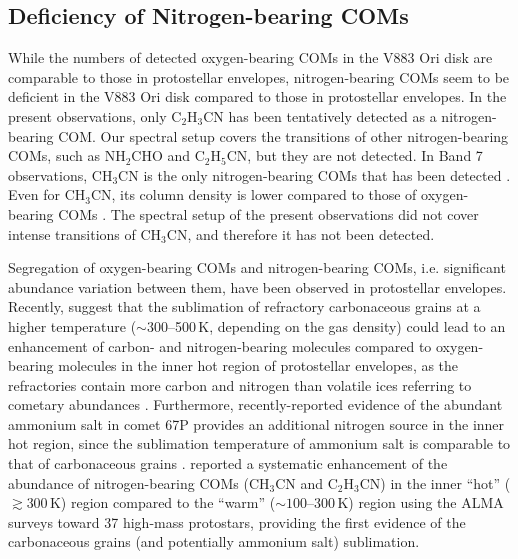 \documentclass[linenumbers, twocolumn, twocolappendix, astrosymb, times]{aastex631}
\begin{document}
\subsection{Deficiency of Nitrogen-bearing COMs}
While the numbers of detected oxygen-bearing COMs in the V883 Ori disk are comparable to those in protostellar envelopes, nitrogen-bearing COMs seem to be deficient in the V883 Ori disk compared to those in protostellar envelopes. In the present observations, 
only C$_2$H$_3$CN has been tentatively detected as a nitrogen-bearing COM. Our spectral setup covers the transitions of other nitrogen-bearing COMs, such as NH$_2$CHO and C$_2$H$_5$CN, but they are not detected. In Band 7 observations, CH$_3$CN is the only nitrogen-bearing COMs that has been detected \citep{Lee2019}. Even for CH$_3$CN, its column density is lower compared to those of oxygen-bearing COMs \citep{Lee2019}. The spectral setup of the present observations did not cover intense transitions of CH$_3$CN, and therefore it has not been detected. 

Segregation of oxygen-bearing COMs and nitrogen-bearing COMs, i.e. significant abundance variation between them, have been observed in protostellar envelopes.
Recently, \citet{vantHoff2020} suggest that the sublimation of refractory carbonaceous grains at a higher temperature ($\sim300$--500\,K, depending on the gas density) could lead to an enhancement of carbon- and nitrogen-bearing molecules compared to oxygen-bearing molecules in the inner hot region of protostellar envelopes, as the refractories contain more carbon and nitrogen than volatile ices referring to cometary abundances \citep{Rice2018, Rubin2019}. Furthermore, recently-reported evidence of the abundant ammonium salt in comet 67P \citep{Altwegg2020, Poch2020} provides an additional nitrogen source in the inner hot region, since the sublimation temperature of ammonium salt is comparable to that of carbonaceous grains \citep[$\sim200$--250\,K; e.g.,][]{Noble2013, Bergner2016}. \citet{Nazari2023} reported a systematic enhancement of the abundance of nitrogen-bearing COMs (CH$_3$CN and C$_2$H$_3$CN) in the inner ``hot'' ($\gtrsim300$\,K) region compared to the ``warm'' ($\sim100$--300\,K) region using the ALMA surveys toward 37 high-mass protostars, providing the first evidence of the carbonaceous grains (and potentially ammonium salt) sublimation.
\end{document}
